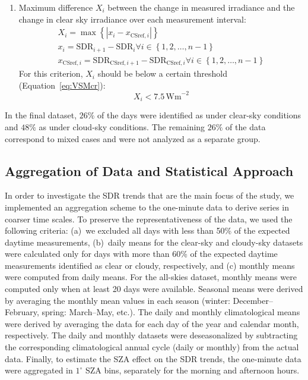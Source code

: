 \documentclass[applsci,article,accept,moreauthors,pdftex]{Definitions/mdpi}
\begin{document}
\begin{enumerate}
\item
  Maximum difference \(X_i\) between the change in measured irradiance
  and the change in clear sky irradiance over each measurement interval:
  \begin{gather}
    X_i = \max{\left \{ \left | x_i - x_{\text{CSref},i} \right | \right \}} \label{eq:VSM3} \\
    x_i = \text{SDR}_{i+1} - \text{SDR}_{i} \forall i \in \left \{ 1, 2, \ldots, n-1 \right \} \label{eq:VSM1} \\
    x_{\text{CSref},i} = \text{SDR}_{\text{CSref},i+1} - \text{SDR}_{\text{CSref},i} \forall i \in \left \{ 1, 2, \ldots, n-1 \right \} \label{eq:VSM2}
  \end{gather} For this criterion, \(X_i\) should be below a certain
  threshold (Equation~\eqref{eq:VSMcr}): \begin{equation}
    X_i < 7.5\,\text{Wm}^{-2} \label{eq:VSMcr}
  \end{equation}
\end{enumerate}

In the final dataset, \(26\%\) of the days were identified as under
clear-sky conditions and \(48\%\) as under cloud-sky conditions. The
remaining \(26\%\) of the data correspond to mixed cases and were not
analyzed as a separate group.

\hypertarget{aggregationstatistical}{%
\subsection{Aggregation of Data and Statistical
Approach}\label{aggregationstatistical}}

In order to investigate the SDR trends that are the main focus of the
study, we implemented an aggregation scheme to the one-minute data to
derive series in coarser time scales. To preserve the representativeness
of the data, we used the following criteria: (a)~we excluded all days with
less than 50\% of the expected daytime measurements, (b)~daily means for
the clear-sky and cloudy-sky datasets were calculated only for days with
more than 60\% of the expected daytime measurements identified as clear
or cloudy, respectively, and (c) monthly means were computed from daily means.
For the all-skies dataset, monthly means were computed only when at least
20 days were available. Seasonal means were derived by averaging the
monthly mean values in each season (winter: December--February, spring:
March--May, etc.). The daily and monthly climatological means were
derived by averaging the data for each day of the year and calendar month,
respectively. The daily and monthly datasets were deseasonalized by
subtracting the corresponding climatological annual cycle (daily or
monthly) from the actual data. Finally, to estimate the SZA effect on
the SDR trends, the one-minute data were aggregated in \(1^{\circ}\) SZA
bins, separately for the morning and afternoon hours.
\end{document}
